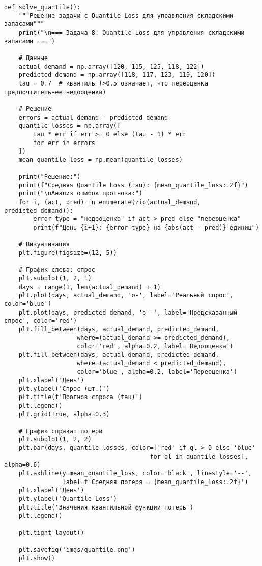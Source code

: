 \begin{verbatim}
def solve_quantile():
    """Решение задачи с Quantile Loss для управления складскими запасами"""
    print("\n=== Задача 8: Quantile Loss для управления складскими запасами ===")
    
    # Данные
    actual_demand = np.array([120, 115, 125, 118, 122])
    predicted_demand = np.array([118, 117, 123, 119, 120])
    tau = 0.7  # квантиль (>0.5 означает, что переоценка предпочтительнее недооценки)
    
    # Решение
    errors = actual_demand - predicted_demand
    quantile_losses = np.array([
        tau * err if err >= 0 else (tau - 1) * err
        for err in errors
    ])
    mean_quantile_loss = np.mean(quantile_losses)
    
    print("Решение:")
    print(f"Средняя Quantile Loss (tau): {mean_quantile_loss:.2f}")
    print("\nАнализ ошибок прогноза:")
    for i, (act, pred) in enumerate(zip(actual_demand, predicted_demand)):
        error_type = "недооценка" if act > pred else "переоценка"
        print(f"День {i+1}: {error_type} на {abs(act - pred)} единиц")
    
    # Визуализация
    plt.figure(figsize=(12, 5))
    
    # График слева: спрос
    plt.subplot(1, 2, 1)
    days = range(1, len(actual_demand) + 1)
    plt.plot(days, actual_demand, 'o-', label='Реальный спрос', color='blue')
    plt.plot(days, predicted_demand, 'o--', label='Предсказанный спрос', color='red')
    plt.fill_between(days, actual_demand, predicted_demand, 
                    where=(actual_demand >= predicted_demand),
                    color='red', alpha=0.2, label='Недооценка')
    plt.fill_between(days, actual_demand, predicted_demand,
                    where=(actual_demand < predicted_demand),
                    color='blue', alpha=0.2, label='Переоценка')
    plt.xlabel('День')
    plt.ylabel('Спрос (шт.)')
    plt.title(f'Прогноз спроса (tau)')
    plt.legend()
    plt.grid(True, alpha=0.3)
    
    # График справа: потери
    plt.subplot(1, 2, 2)
    plt.bar(days, quantile_losses, color=['red' if ql > 0 else 'blue' 
                                        for ql in quantile_losses], alpha=0.6)
    plt.axhline(y=mean_quantile_loss, color='black', linestyle='--',
                label=f'Средняя потеря = {mean_quantile_loss:.2f}')
    plt.xlabel('День')
    plt.ylabel('Quantile Loss')
    plt.title('Значения квантильной функции потерь')
    plt.legend()
    
    plt.tight_layout()
    
    plt.savefig('imgs/quantile.png')
    plt.show()

\end{verbatim}

